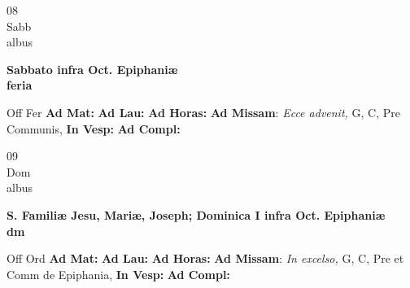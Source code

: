 \documentclass[10pt, openany]{book}
\begin{document}
        \begin{center}
            \begin{minipage}{3.5in}
                \vspace{2em}
                \begin{minipage}{0.5in}
                    {\Huge 08} \\
                    {\normalsize Sabb} \\
                    {\normalsize albus}
                \end{minipage}
                \begin{minipage}{3.0in}
                    \textbf{ \large Sabbato infra Oct. Epiphaniæ \\
                    \textnormal{\normalsize feria}} \\ 
                \end{minipage}
                \begin{justify}Off Fer
                    \textbf{Ad Mat: }
                    \textbf{Ad Lau: }
                    \textbf{Ad Horas: }\textbf{Ad Missam}: \textit{Ecce advenit,} G, C, Pre Communis,  
                    \textbf{In Vesp: }
                    \textbf{Ad Compl: }
                \end{justify}
            \end{minipage}
        \end{center}
    
        \begin{center}
            \begin{minipage}{3.5in}
                \vspace{2em}
                \begin{minipage}{0.5in}
                    {\Huge 09} \\
                    {\normalsize Dom} \\
                    {\normalsize albus}
                \end{minipage}
                \begin{minipage}{3.0in}
                    \textbf{ \large S. Familiæ Jesu, Mariæ, Joseph; Dominica I infra Oct. Epiphaniæ \\
                    \textnormal{\normalsize dm}} \\ 
                \end{minipage}
                \begin{justify}Off Ord
                    \textbf{Ad Mat: }
                    \textbf{Ad Lau: }
                    \textbf{Ad Horas: }\textbf{Ad Missam}: \textit{In excelso,} G, C, Pre et Comm de Epiphania,  
                    \textbf{In Vesp: }
                    \textbf{Ad Compl: }
                \end{justify}
            \end{minipage}
        \end{center}
    
\end{document}
